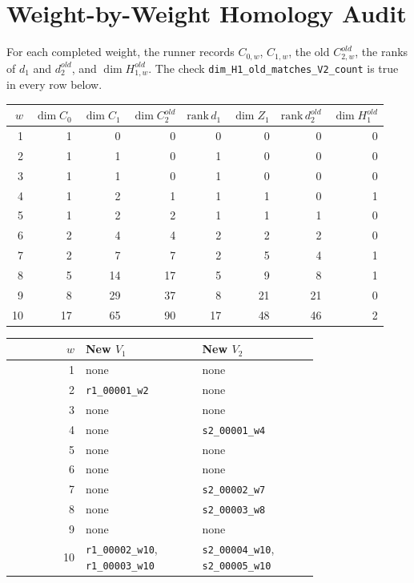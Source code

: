 \documentclass[11pt]{article}
\begin{document}
\section*{Weight-by-Weight Homology Audit}

For each completed weight, the runner records \(C_{0,w}\), \(C_{1,w}\), the
old \(C^{old}_{2,w}\), the ranks of \(d_1\) and \(d^{old}_2\), and
\(\dim H^{old}_{1,w}\).  The check
\texttt{dim\_H1\_old\_matches\_V2\_count} is true in every row below.

\begin{center}
\small
\begin{tabular}{rrrrrrrr}
\toprule
\(w\) & \(\dim C_0\) & \(\dim C_1\) & \(\dim C^{old}_2\) &
\(\mathrm{rank}\,d_1\) & \(\dim Z_1\) & \(\mathrm{rank}\,d^{old}_2\) &
\(\dim H^{old}_1\) \\
\midrule
1 & 1 & 0 & 0 & 0 & 0 & 0 & 0 \\
2 & 1 & 1 & 0 & 1 & 0 & 0 & 0 \\
3 & 1 & 1 & 0 & 1 & 0 & 0 & 0 \\
4 & 1 & 2 & 1 & 1 & 1 & 0 & 1 \\
5 & 1 & 2 & 2 & 1 & 1 & 1 & 0 \\
6 & 2 & 4 & 4 & 2 & 2 & 2 & 0 \\
7 & 2 & 7 & 7 & 2 & 5 & 4 & 1 \\
8 & 5 & 14 & 17 & 5 & 9 & 8 & 1 \\
9 & 8 & 29 & 37 & 8 & 21 & 21 & 0 \\
10 & 17 & 65 & 90 & 17 & 48 & 46 & 2 \\
\bottomrule
\end{tabular}
\end{center}

\begin{center}
\begin{tabular}{rL{0.38\linewidth}L{0.38\linewidth}}
\toprule
\(w\) & New \(V_1\) & New \(V_2\) \\
 & none & none \\
2 & \texttt{r1\_00001\_w2} & none \\
3 & none & none \\
4 & none & \texttt{s2\_00001\_w4} \\
5 & none & none \\
6 & none & none \\
7 & none & \texttt{s2\_00002\_w7} \\
8 & none & \texttt{s2\_00003\_w8} \\
9 & none & none \\
10 & \texttt{r1\_00002\_w10}, \texttt{r1\_00003\_w10} &
\texttt{s2\_00004\_w10}, \texttt{s2\_00005\_w10} \\
\bottomrule
\end{tabular}
\end{center}
\end{document}
